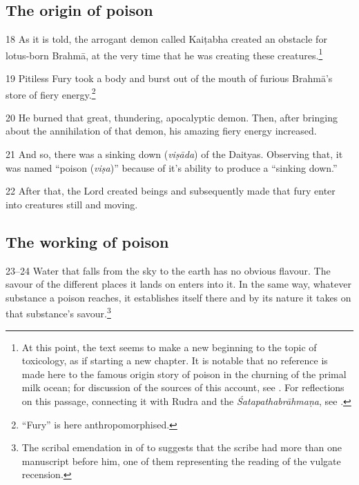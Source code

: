 \subsection{The origin of  poison}  

\begin{translation}[resume]  

\item
 [18]  As it is told, the arrogant  demon called Kaiṭabha  created an obstacle for 
 lotus-born Brahmā, at  the very time that he  was creating these  
 creatures.\footnote{At  this point, the text  seems to make a new  beginning to 
 the topic  of toxicology, as if  starting a new  chapter.  It is notable  that no 
 reference is  made here to  the famous origin  story of poison in the  churning 
 of the primal  milk ocean; for  discussion of the  sources of this  account, see  
 \cite{bede-1967}. For reflections on this  passage, connecting it  with Rudra 
 and the  \emph{Śatapathabrāhmaṇa},  see  \cite{mana-2019}.}  

\item
[19] Pitiless Fury took a  body and burst out of  the mouth of furious  Brahmā's 
store of fiery  energy.\footnote{“Fury”  is here  anthropomorphised.}  

\item
[20]  He burned that  great, thundering,  apocalyptic  demon. Then,  after 
bringing about the annihilation of  that demon, his  amazing fiery  energy 
increased.  

\item
 [21]  And so, there was a  sinking down  (\emph{viṣāda}) of  the Daityas.  
 Observing that, it was named  “poison  (\emph{viṣa})”  because of it's  ability 
 to produce a  “sinking down.”  

\item
 [22] After  that, the Lord  created beings and  subsequently made  that fury 
 enter into creatures  still and moving.  

\subsection{The working of poison}

\item
 [23--24]  Water that falls  from the sky to the  earth has no  obvious flavour. 
 The savour of the  different places it  lands on enters into  it.  In the same way, 
 whatever substance  a poison reaches, it  establishes itself  there and by its  
 nature it  takes on that  substance's  savour.\footnote{The  scribal emendation  
 in   of    to    
 suggests that the  scribe had more  than  one manuscript  before him, one  of 
 them  representing the  reading of the  vulgate  recension.}  


\end{translation}
